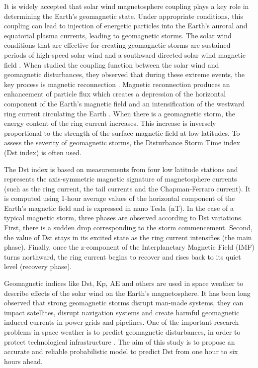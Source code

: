 It is widely accepted that solar wind magnetosphere coupling plays a key role in determining the Earth’s 
geomagnetic state. Under appropriate conditions, this coupling can lead to injection of energetic particles 
into the Earth’s auroral and equatorial plasma currents, leading to geomagnetic storms. The solar wind conditions 
that are effective for creating geomagnetic storms are sustained periods of high-speed solar wind and a southward 
directed solar wind magnetic field \citep{JGR:JGR10260}. When \citet{1981AkasofuE} studied the coupling function 
between the solar wind and geomagnetic disturbances, they observed that during these extreme events, the key process 
is magnetic reconnection \citep{magneticreconnection}. Magnetic reconnection produces an enhancement of particle flux 
which creates a depression of the horizontal component of the Earth’s magnetic field and an intensification of the 
westward ring current circulating the Earth \citep{JGRA:JGRA11775}. When there is a geomagnetic storm, the energy 
content of the ring current increases. This increase is inversely proportional to the strength of the surface magnetic 
field at low latitudes. To assess the severity of geomagnetic storms, the Disturbance Storm Time index (Dst index) is 
often used. 

The Dst index \citep{Sugiura1964} is based on measurements from four low latitude stations and 
represents the axis-symmetric magnetic signature of magnetosphere currents (such as the ring current, 
the tail currents and the Chapman-Ferraro current). It is computed using 1-hour average values of the 
horizontal component of the Earth’s magnetic field and is expressed in nano Tesla (nT). In the case of a 
typical magnetic storm, three phases are observed according to Dst variations. First, there is a sudden drop 
corresponding to the storm commencement. Second, the value of Dst stays in its excited state as the ring current 
intensifies (the main phase). Finally, once the z-component of the Interplanetary Magnetic Field (IMF) turns 
northward, the ring current begins to recover and rises back to its quiet level (recovery phase). 

Geomagnetic indices like Dst, Kp, AE and others are used in space weather to describe effects of the solar wind on 
the Earth's magnetosphere. It has been long observed that strong geomagnetic storms disrupt man-made systems, 
they can impact satellites, disrupt navigation systems and create harmful geomagnetic induced currents in power grids 
and pipelines. One of the important research problems in space weather is to predict geomagnetic disturbances, 
in order to protect technological infrastructure \citep{Singh2010}. The aim of this study is to propose an 
accurate and reliable probabilistic model to predict Dst from one hour to six hours ahead. 

